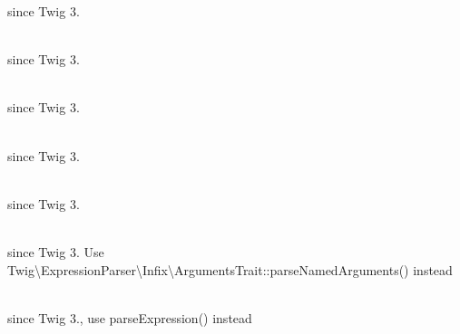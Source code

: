 \begin{DoxyRefList}
\label{deprecated__deprecated000025}%
%
since Twig 3.  
\item[{\parbox[t]{\linewidth}{Global(e) \doxylink{class_twig_1_1_extension_1_1_escaper_extension_a1a2d17c791de8454518d75b6dc5ed8ee}{Escaper\+Extension::\+set\+Safe\+Classes} (array \$safe\+Classes=\+[]\+)}}]\hfill \\
\label{deprecated__deprecated000028}%
%
since Twig 3.  
\item[{\parbox[t]{\linewidth}{Class \doxylink{class_twig_1_1_expression_parser}{Expression\+Parser} }}]\hfill \\
\label{deprecated__deprecated000007}%
%
since Twig 3.  
\item[{\parbox[t]{\linewidth}{Global(e) \doxylink{class_twig_1_1_expression_parser_abe5a3390382bf3aba3867940eec28a61}{Expression\+Parser::\+OPERATOR\+\_\+\+LEFT} }}]\hfill \\
\label{deprecated__deprecated000008}%
%
since Twig 3.  
\item[{\parbox[t]{\linewidth}{Global(e) \doxylink{class_twig_1_1_expression_parser_a90a1202797b2ac98156a907ac86d0052}{Expression\+Parser::\+OPERATOR\+\_\+\+RIGHT} }}]\hfill \\
\label{deprecated__deprecated000009}%
%
since Twig 3.  
\item[{\parbox[t]{\linewidth}{Global(e) \doxylink{class_twig_1_1_expression_parser_a7d9e9372bc6498d076030a4caf7bc188}{Expression\+Parser::\+parse\+Arguments} ()}}]\hfill \\
\label{deprecated__deprecated000020}%
%
since Twig 3. Use Twig\textbackslash{}\+Expression\+Parser\textbackslash{}\+Infix\textbackslash{}\+Arguments\+Trait::\+parse\+Named\+Arguments() instead  
\item[{\parbox[t]{\linewidth}{Global(e) \doxylink{class_twig_1_1_expression_parser_ac8125f8f7746662e24757a1207fe9986}{Expression\+Parser::\+parse\+Array\+Expression} ()}}]\hfill \\
\label{deprecated__deprecated000012}%
%
since Twig 3., use parse\+Expression() instead  
\item[{\parbox[t]{\linewidth}{Global(e) \doxylink{class_twig_1_1_expression_parser_a9d63b236eb972c8932a82eb72b6b74d2}{Expression\+Parser::\+parse\+Assignment\+Expression} ()}}]\hfill \\

\end{DoxyRefList}
